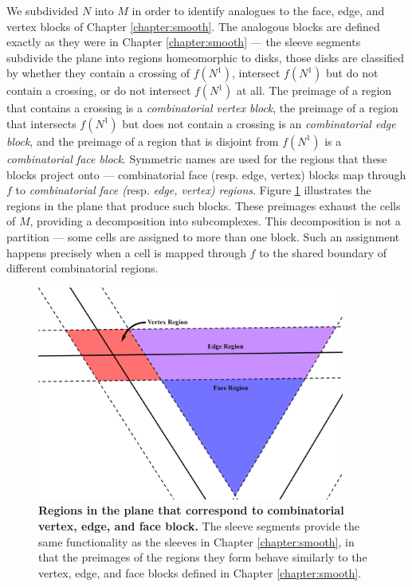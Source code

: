 
We subdivided $N$ into $M$ in order to identify analogues to the face, edge, and vertex blocks of Chapter \ref{chapter:smooth}.
The analogous blocks are defined exactly as they were in Chapter \ref{chapter:smooth} --- the sleeve segments subdivide the plane into regions homeomorphic to disks, those disks are classified by whether they contain a crossing of $f(N^1)$, intersect $f(N^1)$ but do not contain a crossing, or do not intersect $f(N^1)$ at all.
The preimage of a region that contains a crossing is a \emph{combinatorial vertex block}, the preimage of a region that intersects $f(N^1)$ but does not contain a crossing is an \emph{combinatorial edge block}, and the preimage of a region that is disjoint from $f(N^1)$ is a \emph{combinatorial face block}.
Symmetric names are used for the regions that these blocks project onto --- combinatorial face (resp. edge, vertex) blocks map through $f$ to \emph{combinatorial face (}resp. \emph{edge, vertex) regions}.
Figure \ref{fig:pl-regions} illustrates the regions in the plane that produce such blocks.
These preimages exhaust the cells of $M$, providing a decomposition into subcomplexes.
This decomposition is not a partition --- some cells are assigned to more than one block.
Such an assignment happens precisely when a cell is mapped through $f$ to the shared boundary of different combinatorial regions.


\begin{figure}[h!]
	\centering
	\includegraphics[width=0.9\textwidth]{figures/pl-regions.png}
	\caption{
		\textbf{Regions in the plane that correspond to combinatorial vertex, edge, and face block.}
		The sleeve segments provide the same functionality as the sleeves in Chapter \ref{chapter:smooth}, in that the preimages of the regions they form behave similarly to the vertex, edge, and face blocks defined in Chapter \ref{chapter:smooth}.
	}
	\label{fig:pl-regions}
\end{figure}

